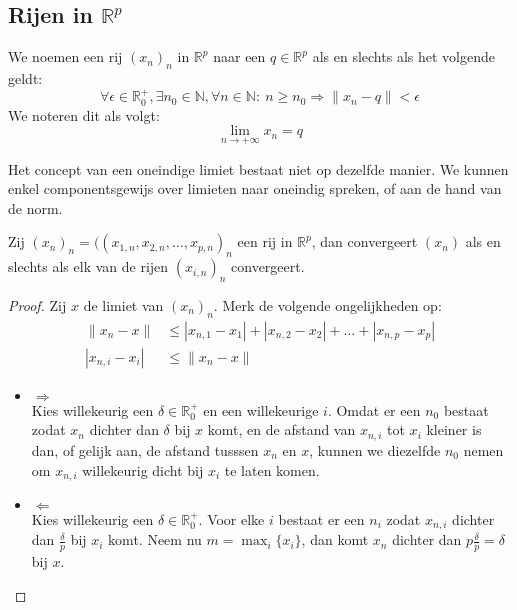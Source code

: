 \documentclass[main.tex]{subfiles}
\begin{document}
\subsection{Rijen in $\mathbb{R}^p$}
\label{sec:rijen-mathbbrp}

\begin{de}
  We noemen een rij $(x_{n})_{n}$ in $\mathbb{R}^{p}$  naar een $q\in \mathbb{R}^{p}$ als en slechts als het volgende geldt:
  \[ \forall \epsilon \in \mathbb{R}_{0}^{+}, \exists n_{0}\in \mathbb{N}, \forall n\in \mathbb{N}:\ n\ge n_{0} \Rightarrow \|x_{n}-q\| < \epsilon  \]
  We noteren dit als volgt:
  \[ \lim_{n\rightarrow +\infty}x_{n} = q \]
\end{de}

\begin{opm}
  Het concept van een oneindige limiet bestaat niet op dezelfde manier.
  We kunnen enkel componentsgewijs over limieten naar oneindig spreken, of aan de hand van de norm.
\end{opm}

\begin{st}
  \label{st:in-rp-convergeert-asa-componenten-convergeren}
  Zij $(x_{n})_{n} = ((x_{1,n},x_{2,n},\dotsc,x_{p,n})_{n}$ een rij in $\mathbb{R}^{p}$, dan convergeert $(x_{n})$ als en slechts als elk van de rijen $(x_{i,n})_{n}$ convergeert.

  \begin{proof}
    Zij $x$ de limiet van $(x_{n})_{n}$.
    Merk de volgende ongelijkheden op:
    \begin{align*}
      \|x_{n}-x\| &\le |x_{n,1}-x_{1}| + |x_{n,2}-x_{2}| + \dotsc + |x_{n,p}-x_{p}|\\
      |x_{n,i}-x_{i}| &\le \|x_{n}-x\|
    \end{align*}
    \begin{itemize}
    \item $\Rightarrow$\\
      Kies willekeurig een $\delta \in \mathbb{R}_{0}^{+}$ en een willekeurige $i$.
      Omdat er een $n_{0}$ bestaat zodat $x_{n}$ dichter dan $\delta$ bij $x$ komt, en de afstand van $x_{n,i}$ tot $x_{i}$ kleiner is dan, of gelijk aan, de afstand tusssen $x_{n}$ en $x$, kunnen we diezelfde $n_{0}$ nemen om $x_{n,i}$ willekeurig dicht bij $x_{i}$ te laten komen.
    \item $\Leftarrow$\\
      Kies willekeurig een $\delta \in \mathbb{R}_{0}^{+}$.
      Voor elke $i$ bestaat er een $n_{i}$ zodat $x_{n,i}$ dichter dan $\frac{\delta}{p}$ bij $x_{i}$ komt.
      Neem nu $m=\max_{i}\{x_{i}\}$, dan komt $x_{n}$ dichter dan $p\frac{\delta}{p}=\delta$ bij $x$.
    \end{itemize}
  \end{proof}
\end{st}
\end{document}
